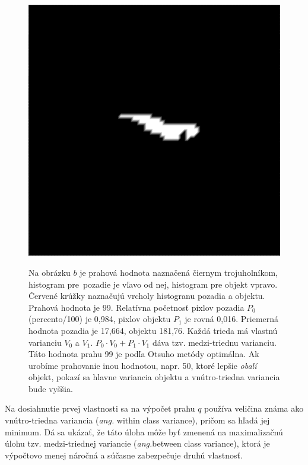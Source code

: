 \documentclass[a4paper,11pt,oneside]{article}%
\begin{document}
\begin{figure}[h!]
\begin{center}
    {\includegraphics[scale=0.155]{pics/cropT8_otsu.png}}
\caption{Na obrázku $b$ je prahová hodnota naznačená čiernym trojuholníkom, histogram pre~pozadie je vľavo od nej, histogram pre objekt vpravo. Červené krúžky naznačujú vrcholy histogranu pozadia a objektu. Prahová hodnota je 99. Relatívna početnosť pixlov pozadia $P_0$ (percento/100) je 0,984, pixlov objektu $P_1$  je rovná 0,016. Priemerná hodnota pozadia je 17,664, objektu 181,76. Každá trieda má vlastnú varianciu $V_0$ a $V_1$. $P_0\cdot V_0+ P_1\cdot V_1$ dáva tzv. medzi-triednu varianciu. Táto hodnota prahu 99 je podľa Otsuho metódy optimálna. Ak urobíme prahovanie inou hodnotou, napr. 50, ktoré lepšie \textit{obalí} objekt, pokazí sa hlavne variancia objektu a vnútro-triedna variancia bude vyššia. }
\label{fig:otsuteoria}
\end{center}   
\end{figure}

 Na dosiahnutie prvej vlastnosti sa na výpočet prahu $q$ používa veličina známa ako vnútro-triedna variancia (\textit{ang.} within class variance), pričom sa hľadá jej minimum. Dá sa ukázať, že táto úloha môže byť zmenená na maximalizačnú úlohu tzv. medzi-triednej variancie (\textit{ang.}between class variance), ktorá je výpočtovo menej náročná a súčasne zabezpečuje druhú vlastnosť.  
\end{document}
